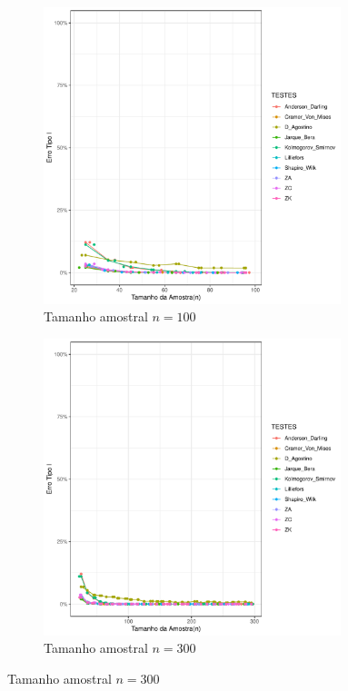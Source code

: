 \documentclass[a4paper,11pt]{article} %
\begin{document}
\begin{figure}[H]
    \vspace{0.5cm} %
    \begin{subfigure}[b]{0.45\textwidth}
        \centering
        \includegraphics[width=0.95\textwidth]{Distribuição Cauchy/Erro Tipo I/erro_tipo_I_cauchy_100.pdf}
        \caption{Tamanho amostral \(n = 100\)}
        \label{fig:cauchy_100}
    \end{subfigure}
    \hfill
    \begin{subfigure}[b]{0.45\textwidth}
        \centering
        \includegraphics[width=0.95\textwidth]{Distribuição Cauchy/Erro Tipo I/erro_tipo_I_cauchy_300.pdf}
        \caption{Tamanho amostral \(n = 300\)}
        \label{fig:cauchy_300}
    \end{subfigure}
    

\end{figure}
\end{document}
